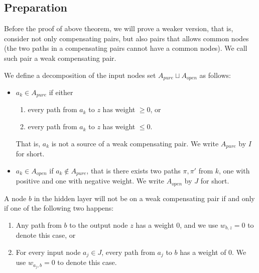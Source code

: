 				
				\subsection{Preparation}
				
				Before the proof of above theorem, we will prove a weaker version, that is, consider not only compensating pairs, but also pairs that allows common nodes (the two paths in a compensating pairs cannot have a common nodes). We call such pair a weak compensating pair.
				
				
				\begin{definition}
					We define a decomposition of the input nodes set $A_{pure}\sqcup A_{open}$ as follows:  
					\begin{itemize}
						\item $a_k \in A_{pure}$  if either
						\begin{enumerate}
							\item every path from $a_k$ to $z$ has weight $\geq 0$, or
							\item every path from $a_k$ to $z$ has weight $\leq 0$. 
						
						\end{enumerate}
						That is, $a_k$ is not a source of a weak compensating pair. 	We write $A_{pure}$ by $I$ for short.
						\item $a_k \in A_{open}$ if $a_k \notin A_{pure}$, that is there exists two paths $\pi,\pi'$ from $k$, 
						one with positive and one with negative weight. 	We write $A_{open}$ by $J$ for short.
					\end{itemize}
				\end{definition} 
				
				
				
				\begin{lemma} \label{lem:open_node_2}
					A node $b$ in the hidden layer will not be on a weak compensating pair if and only if one of the following two happens:
					\begin{enumerate}
						\item Any path from $b$ to the output node $z$ has a weight $0$, and we use $w_{b,z}=0$ to denote this case, or
						\item For every input node $a_j\in J$, every path from $a_j$ to $b$ has a weight of $0$. We use $w_{a_j,b}=0$ to denote this case.
					\end{enumerate}
				
				\end{lemma}
				
